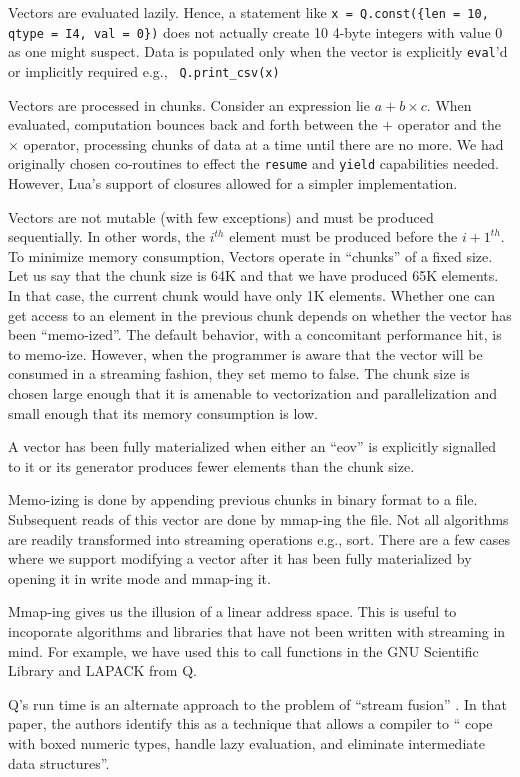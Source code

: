 Vectors are evaluated lazily. Hence, a statement like 
{\tt x = Q.const(\{len = 10, qtype = I4, val = 0\})} does not actually create 10
4-byte integers with value 0 as one might suspect. Data is populated only when
the vector is explicitly {\tt eval}'d or implicitly required e.g., {\tt
Q.print\_csv(x)}

Vectors are processed in chunks. Consider an expression  lie \(a + b\times c\).
When  evaluated, computation bounces back and forth between the \(+\) operator
and the \(\times\) operator, processing chunks of data at a time until there are
no more. We had originally chosen co-routines to effect the {\tt resume} and
{\tt yield} capabilities needed. However, Lua's support of closures allowed for
a simpler implementation.

Vectors are not mutable (with few exceptions)
and must be produced sequentially. In other words, the \(i^{th}\) element must
be produced before the \({i+1}^{th}\). To minimize memory consumption, Vectors
operate in ``chunks'' of a fixed size. Let us say that the chunk size is 64K and
that we have produced 65K elements. In that case, the current chunk would have
only 1K elements. Whether one can get access to an element in the previous chunk
depends on whether the vector has been ``memo-ized''. The default behavior, with
a concomitant performance hit, is to memo-ize. However, when the programmer is
aware that the vector will be consumed in a streaming fashion, they set memo
to false. The chunk size is chosen large enough that it is amenable to
vectorization and parallelization and small enough that its memory consumption
is low.

A vector has been fully materialized when either an ``eov'' is explicitly
signalled to it or its generator produces fewer elements than the chunk size. 


Memo-izing is done by appending previous chunks in binary format to a file.
Subsequent reads of this vector are done by mmap-ing the file. Not all
algorithms are readily transformed into streaming operations e.g., sort. There
are a few cases where we support modifying a vector after it has been fully
materialized by opening it in write mode and mmap-ing it.

Mmap-ing gives us the illusion of a linear address space. This is useful to
incoporate algorithms and libraries that have not been written with streaming in
mind. For example, we have used this to call functions in the GNU Scientific
Library and LAPACK from Q.

Q's run time is an alternate approach to the problem of ``stream fusion''
\cite{Mainland2017}. In
that paper, the authors identify this as a technique that allows a compiler to
`` cope with boxed numeric types, handle lazy evaluation, and
eliminate intermediate data structures''.
